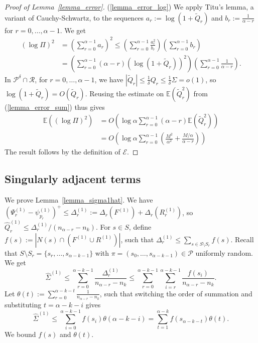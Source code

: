 \documentclass{article}
\theoremstyle{plain}
\theoremstyle{remark}
\theoremstyle{plain}
\numberwithin{equation}{section}
\begin{document}
\begin{proof}[Proof of Lemma~\ref{lemma_error}]
		(\ref{lemma_error_log}) We apply Titu's lemma, a variant of Cauchy-Schwartz, to the sequences $a_r:=\log(1+\widetilde{Q}_r)$ and $b_r:=\tfrac1{\alpha-r}$ for $r=0,\ldots,\alpha-1$. We get
		\begin{align}
			(\log\Pi)^2&=\left(\sum_{r=0}^{\alpha-1}a_r\right)^2\leq\left(\sum_{r=0}^{\alpha-1}\frac{a_r^2}{b_r}\right)\left(\sum_{r=0}^{\alpha-1}b_r\right)
			\\&=\left(\sum_{r=0}^{\alpha-1}(\alpha-r)(\log(1+\widetilde{Q}_r))^2\right)\left(\sum_{r=0}^{\alpha-1}\frac1{\alpha-r}\right).
		\end{align}
		In $\mathcal{P}^{\delta}\cap\mathcal{R}$, for $r=0,\ldots,\alpha-1$, we have $|\widetilde{Q}_r|\leq\tfrac1{\delta}Q_r\leq\tfrac1{\delta}\Sigma=o(1)$, so $\log(1+\widetilde{Q}_r)=O(\widetilde{Q}_r)$. Reusing the estimate on $\mathbb{E}(\widetilde{Q}_r^2)$ from (\ref{lemma_error_sum}) thus gives
		\begin{align}
			\mathbb{E}((\log\Pi)^2)
			&=O\left(\log\alpha\sum_{r=0}^{\alpha-1}(\alpha-r)\mathbb{E}(\widetilde{Q}_r^2)\right)
			\\&=O\left(\log\alpha\sum_{r=0}^{\alpha-1}\left(\frac{M^2}{\alpha^2}+\frac{M/\alpha}{\alpha-r}\right)\right)
		\end{align}
		The result follows by the definition of $\mathscr{E}$.
	\end{proof}
	
	\subsection{Singularly adjacent terms}\label{subsection_proof_psi1}
	
	We prove Lemma~\ref{lemma_sigma1hat}. We have $(\Psi_r^{(1)}-\psi_{p_r}^{(1)})^+\leq\Delta_r^{(1)}:=\Delta_r(F^{(1)})+\Delta_r(R_r^{(1)})$, so $\hat{Q}_r^{(1)}\leq\Delta_r^{(1)}/(n_{\alpha-r}-n_k)$. For $s\in S$, define $f(s):=|N(s)\cap(F^{(1)}\cup R^{(1)})|$, such that $\Delta_r^{(1)}\leq\sum_{s\in S\setminus S_r}f(s)$. Recall that $S\setminus S_r=\{s_r,\ldots,s_{\alpha-k-1}\}$ with $\pi=(s_0,\ldots,s_{\alpha-k-1})\in\mathcal{P}$ uniformly random. We get $$\hat{\Sigma}^{(1)}\leq\sum_{r=0}^{\alpha-k-1}\frac{\Delta_r^{(1)}}{n_{\alpha-r}-n_k}\leq\sum_{r=0}^{\alpha-k-1}\sum_{i=r}^{\alpha-k-1}\frac{f(s_i)}{n_{\alpha-r}-n_k}.$$ Let $\theta(t):=\sum_{r=0}^{\alpha-k-t}\frac1{n_{\alpha-r}-n_k}$, such that switching the order of summation and substituting $t=\alpha-k-i$ gives $$\hat{\Sigma}^{(1)}\leq\sum_{i=0}^{\alpha-k-1}f(s_i)\theta(\alpha-k-i)=\sum_{t=1}^{\alpha-k}f(s_{\alpha-k-t})\theta(t).$$ We bound $f(s)$ and $\theta(t)$.
	
\end{document}
